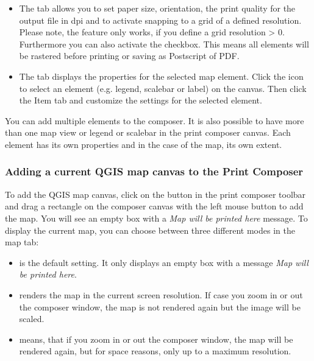 \begin{itemize}
\item The  tab allows you to set paper size, orientation, the
print quality for the output file in dpi and to activate snapping to a grid
of a defined resolution. Please note, the  feature
only works, if you define a grid resolution > 0. Furthermore you can also
activate the  checkbox. This means all elements
will be rastered before printing or saving as Postscript of PDF.
\item The  tab displays the properties for the selected map element. 
Click the  
icon to select an element (e.g. legend, scalebar or label) on the canvas. 
Then click the Item tab and customize the settings for the selected 
element.
\end{itemize}

You can add multiple elements to the composer. It is also possible to have 
more than one map view or legend or scalebar in the print composer canvas. 
Each element has its own properties and in the case of the map, its own 
extent.

\subsubsection{Adding a current QGIS map canvas to the Print Composer}

To add the QGIS map canvas, click on the  button in the print composer toolbar and drag a 
rectangle on the composer canvas with the left mouse button to add the map. 
You will see an empty box with a \textit{Map will be printed here} message.
To display the current map, you can choose between three different modes in
the map  tab:

\begin{itemize}
\item {} is the default setting. It only
displays an empty box with a message \textit{Map will be printed here}. 
\item {} renders the map in the current screen
resolution. If case you zoom in or out the composer window, the map is not
rendered again but the image will be scaled.
\item {} means, that if you zoom in or out the
composer window, the map will be rendered again, but for space reasons, only
up to a maximum resolution.
\end{itemize}

